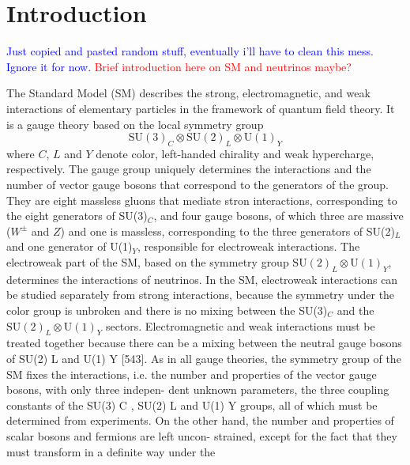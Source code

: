 
\chapter{Introduction}
\label{cha:1}

\textcolor{blue}{Just copied and pasted random stuff, eventually i'll have to clean this mess.
Ignore it for now.}
\textcolor{red}{Brief introduction here on SM and neutrinos maybe?}



The Standard Model (SM) describes the strong, electromagnetic, and weak interactions %
of elementary particles in the framework of quantum field theory.
It is a gauge theory based on the local symmetry group 
\begin{equation}
  \label{eq:smgroup}
  \mathrm{SU(3)}_C \otimes \mathrm{SU(2)}_L \otimes \mathrm{U(1)}_Y
\end{equation}
where $C$, $L$ and $Y$ denote color, left-handed chirality and weak hypercharge, respectively.
The gauge group uniquely determines the interactions and the number of %
vector gauge bosons that correspond to the generators of the group.
They are eight massless gluons that mediate stron interactions, %
corresponding to the eight generators of SU(3)$_C$, and four gauge bosons, %
of which three are massive ($W^\pm$ and $Z$) and one is massless, corresponding %
to the three generators of SU(2)$_L$ and one generator of U(1)$_Y$, responsible for %
electroweak interactions.
The electroweak part of the SM, based on the symmetry group %
$\mathrm{SU(2)}_L \otimes \mathrm{U(1)}_Y$, determines the interactions of neutrinos.
In the SM, electroweak interactions can be studied separately from strong interactions, %
because the symmetry under the color group is unbroken and there is no mixing %
between the SU(3)$_C$ and the $\mathrm{SU(2)}_L \otimes \mathrm{U(1)}_Y$ sectors.
Electromagnetic and weak interactions must be treated together because there can %
be a mixing between the neutral gauge bosons of SU(2) L and U(1) Y [543].
As in all gauge theories, the symmetry group of the SM fixes the interactions, %
i.e. the number and properties of the vector gauge bosons, with only three indepen- %
dent unknown parameters, the three coupling constants of the SU(3) C , SU(2) L and %
U(1) Y groups, all of which must be determined from experiments. On the other %
hand, the number and properties of scalar bosons and fermions are left uncon- %
strained, except for the fact that they must transform in a definite way under the %
